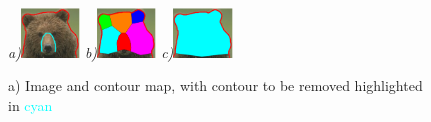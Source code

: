 \begin{figure}[ht]
\centering
{\footnotesize\textit{a)}}\includegraphics[width=0.14\textwidth]{figs/bear_l1.pdf}
{\footnotesize\textit{b)}}\includegraphics[width=0.14\textwidth]{figs/bear_l2.pdf}
{\footnotesize\textit{c)}}\includegraphics[width=0.14\textwidth]{figs/bear_l3.pdf}
\caption{a) Image and contour map, with contour to be removed highlighted in \textcolor{cyan}{cyan}} 
\label{fig:bear_example}
\end{figure}



